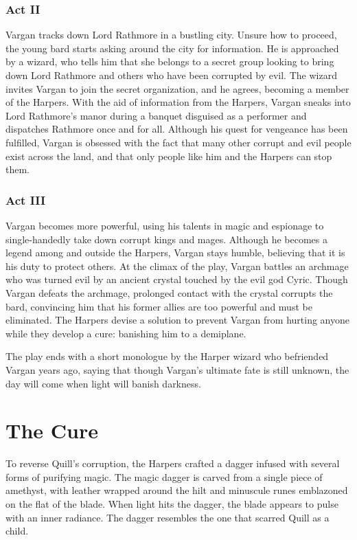 \documentclass[10pt,a4paper,twoside,bg=print,twocolumn,openany,nodeprecatedcode]{dndbook}
\begin{document}
\subsubsection{Act II}
Vargan tracks down Lord Rathmore in a bustling city. Unsure how to proceed, the young bard starts asking around the city for information. He is approached by a wizard, who tells him that she belongs to a secret group looking to bring down Lord Rathmore and others who have been corrupted by evil. The wizard invites Vargan to join the secret organization, and he agrees, becoming a member of the Harpers. With the aid of information from the Harpers, Vargan sneaks into Lord Rathmore's manor during a banquet disguised as a performer and dispatches Rathmore once and for all. Although his quest for vengeance has been fulfilled, Vargan is obsessed with the fact that many other corrupt and evil people exist across the land, and that only people like him and the Harpers can stop them.

\subsubsection{Act III}
Vargan becomes more powerful, using his talents in magic and espionage to single-handedly take down corrupt kings and mages. Although he becomes a legend among and outside the Harpers, Vargan stays humble, believing that it is his duty to protect others. At the climax of the play, Vargan battles an archmage who was turned evil by an ancient crystal touched by the evil god Cyric. Though Vargan defeats the archmage, prolonged contact with the crystal corrupts the bard, convincing him that his former allies are too powerful and must be eliminated. The Harpers devise a solution to prevent Vargan from hurting anyone while they develop a cure: banishing him to a demiplane.

The play ends with a short monologue by the Harper wizard who befriended Vargan years ago, saying that though Vargan's ultimate fate is still unknown, the day will come when light will banish darkness.

\section{The Cure}
To reverse Quill's corruption, the Harpers crafted a dagger infused with several forms of purifying magic. The magic dagger is carved from a single piece of amethyst, with leather wrapped around the hilt and minuscule runes emblazoned on the flat of the blade. When light hits the dagger, the blade appears to pulse with an inner radiance. The dagger resembles the one that scarred Quill as a child.
\end{document}
